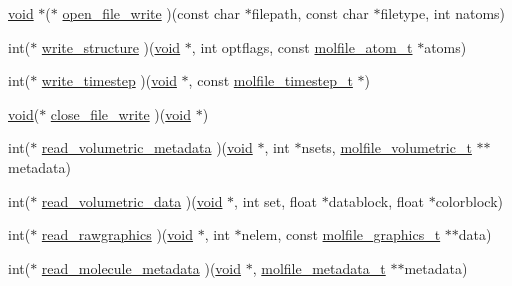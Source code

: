 \begin{DoxyCompactItemize}
\item 
\hyperlink{nbnxn__kernel__simd__4xn__outer_8h_a8dc3f4a797ed992dff49d2fa3477eee8}{void} $\ast$($\ast$ \hyperlink{structmolfile__plugin__t_a01f35d1653fe51bce434f60d7a5b04d2}{open\-\_\-file\-\_\-write} )(const char $\ast$filepath, const char $\ast$filetype, int natoms)
\item 
int($\ast$ \hyperlink{structmolfile__plugin__t_a96caabc2f33c5a710e82cfe20316568f}{write\-\_\-structure} )(\hyperlink{nbnxn__kernel__simd__4xn__outer_8h_a8dc3f4a797ed992dff49d2fa3477eee8}{void} $\ast$, int optflags, const \hyperlink{structmolfile__atom__t}{molfile\-\_\-atom\-\_\-t} $\ast$atoms)
\item 
int($\ast$ \hyperlink{structmolfile__plugin__t_acf10fad00927486a1ce859852658e7b0}{write\-\_\-timestep} )(\hyperlink{nbnxn__kernel__simd__4xn__outer_8h_a8dc3f4a797ed992dff49d2fa3477eee8}{void} $\ast$, const \hyperlink{structmolfile__timestep__t}{molfile\-\_\-timestep\-\_\-t} $\ast$)
\item 
\hyperlink{nbnxn__kernel__simd__4xn__outer_8h_a8dc3f4a797ed992dff49d2fa3477eee8}{void}($\ast$ \hyperlink{structmolfile__plugin__t_a69455eb95d6093deba833b47b9c60c2c}{close\-\_\-file\-\_\-write} )(\hyperlink{nbnxn__kernel__simd__4xn__outer_8h_a8dc3f4a797ed992dff49d2fa3477eee8}{void} $\ast$)
\item 
int($\ast$ \hyperlink{structmolfile__plugin__t_ac54290d6b607ba8b1fd9e38a1e7f69a1}{read\-\_\-volumetric\-\_\-metadata} )(\hyperlink{nbnxn__kernel__simd__4xn__outer_8h_a8dc3f4a797ed992dff49d2fa3477eee8}{void} $\ast$, int $\ast$nsets, \hyperlink{structmolfile__volumetric__t}{molfile\-\_\-volumetric\-\_\-t} $\ast$$\ast$metadata)
\item 
int($\ast$ \hyperlink{structmolfile__plugin__t_a535aeec1aea2739b07b2348c239772b9}{read\-\_\-volumetric\-\_\-data} )(\hyperlink{nbnxn__kernel__simd__4xn__outer_8h_a8dc3f4a797ed992dff49d2fa3477eee8}{void} $\ast$, int set, float $\ast$datablock, float $\ast$colorblock)
\item 
int($\ast$ \hyperlink{structmolfile__plugin__t_a0318edf94ed266fe5a995c02cf2357d9}{read\-\_\-rawgraphics} )(\hyperlink{nbnxn__kernel__simd__4xn__outer_8h_a8dc3f4a797ed992dff49d2fa3477eee8}{void} $\ast$, int $\ast$nelem, const \hyperlink{structmolfile__graphics__t}{molfile\-\_\-graphics\-\_\-t} $\ast$$\ast$data)
\item 
int($\ast$ \hyperlink{structmolfile__plugin__t_ae34996861c7be39038802b1c4d52591d}{read\-\_\-molecule\-\_\-metadata} )(\hyperlink{nbnxn__kernel__simd__4xn__outer_8h_a8dc3f4a797ed992dff49d2fa3477eee8}{void} $\ast$, \hyperlink{structmolfile__metadata__t}{molfile\-\_\-metadata\-\_\-t} $\ast$$\ast$metadata)
$$
\end{DoxyCompactItemize}

